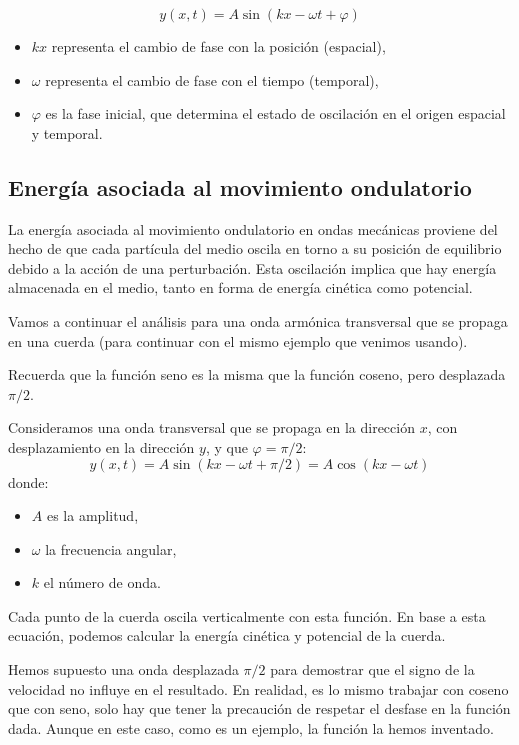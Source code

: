 \begin{equation}
  \boxed{y(x,t) = A \sin(kx - \omega t + \varphi)}
\end{equation}
\begin{itemize}
  \item \(kx\) representa el cambio de fase con la posición (espacial),
  \item \(\omega\) representa el cambio de fase con el tiempo (temporal),
  \item \(\varphi\) es la fase inicial, que determina el estado de oscilación en el origen espacial y temporal.
\end{itemize}

\subsection{Energía asociada al movimiento ondulatorio}

La energía asociada al movimiento ondulatorio en ondas mecánicas proviene del hecho de que cada partícula del medio oscila en torno a su posición de equilibrio debido a la acción de una perturbación. Esta oscilación implica que hay energía almacenada en el medio, tanto en forma de energía cinética como potencial.

Vamos a continuar el análisis para una onda armónica transversal que se propaga en una cuerda (para continuar con el mismo ejemplo que venimos usando). 

\begin{tcolorbox}[myconclusion]
  Recuerda que la función seno es la misma que la función coseno, pero desplazada \(\pi/2\).
\end{tcolorbox}

Consideramos una onda transversal que se propaga en la dirección \(x\), con desplazamiento en la dirección \(y\), y que \(\varphi = \pi/2\):
\[
y(x,t) = A \sin(kx - \omega t + \pi/2) = \boxed{A \cos(kx - \omega t)}
\]
donde:
\begin{itemize}
  \item \(A\) es la amplitud,
  \item \(\omega\) la frecuencia angular,
  \item \(k\) el número de onda.
\end{itemize}

Cada punto de la cuerda oscila verticalmente con esta función. En base a esta ecuación, podemos calcular la energía cinética y potencial de la cuerda.

\begin{tcolorbox}[myconclusion]
  Hemos supuesto una onda desplazada \(\pi/2\) para demostrar que el signo de la velocidad no influye en el resultado. En realidad, es lo mismo trabajar con coseno que con seno, solo hay que tener la precaución de respetar el desfase en la función dada. Aunque en este caso, como es un ejemplo, la función la hemos inventado.
\end{tcolorbox}

